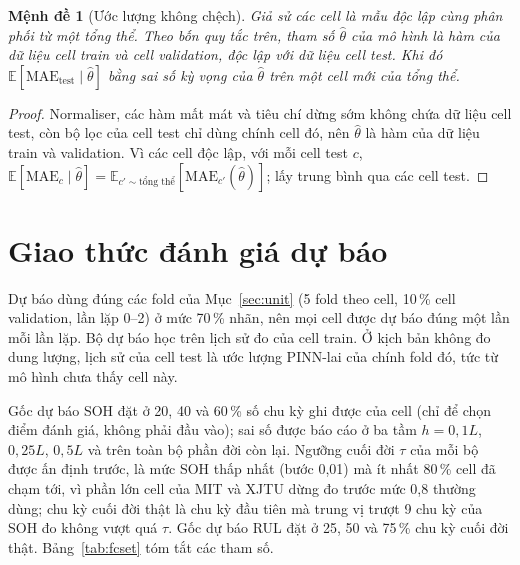\documentclass[12pt,a4paper,oneside]{report}
\theoremstyle{plain}
\newtheorem{menhde}{Mệnh đề}[chapter]
\theoremstyle{definition}
\newcommand{\E}{\mathbb{E}}
\begin{document}
\begin{menhde}[Ước lượng không chệch]\label{md:unbiased}
Giả sử các cell là mẫu độc lập cùng phân phối từ một tổng thể. Theo bốn quy tắc trên, tham số $\hat\theta$ của
mô hình là hàm của dữ liệu cell train và cell validation, độc lập với dữ liệu cell test. Khi đó
$\E[\mathrm{MAE}_\text{test} \mid \hat\theta]$ bằng sai số kỳ vọng của $\hat\theta$ trên một cell mới của tổng thể.
\end{menhde}
\begin{proof}
Normaliser, các hàm mất mát và tiêu chí dừng sớm không chứa dữ liệu cell test, còn bộ lọc của cell test chỉ dùng
chính cell đó, nên $\hat\theta$ là hàm của dữ liệu train và validation. Vì các cell độc lập, với mỗi cell test $c$,
$\E[\mathrm{MAE}_c \mid \hat\theta] = \E_{c' \sim \text{tổng thể}}[\mathrm{MAE}_{c'}(\hat\theta)]$; lấy trung bình qua
các cell test.
\end{proof}

\section{Giao thức đánh giá dự báo}\label{sec:fcproto}

Dự báo dùng đúng các fold của Mục~\ref{sec:unit} (5 fold theo cell, 10\,\% cell validation, lần lặp 0--2) ở mức 70\,\%
nhãn, nên mọi cell được dự báo đúng một lần mỗi lần lặp. Bộ dự báo học trên lịch sử đo của cell train. Ở kịch bản
không đo dung lượng, lịch sử của cell test là ước lượng PINN-lai của chính fold đó, tức từ mô hình chưa thấy cell này.

Gốc dự báo SOH đặt ở 20, 40 và 60\,\% số chu kỳ ghi được của cell (chỉ để chọn điểm đánh giá, không phải đầu vào);
sai số được báo cáo ở ba tầm $h = 0{,}1L$, $0{,}25L$, $0{,}5L$ và trên toàn bộ phần đời còn lại. Ngưỡng cuối đời $\tau$
của mỗi bộ được ấn định trước, là mức SOH thấp nhất (bước 0,01) mà ít nhất 80\,\% cell đã chạm tới, vì phần lớn cell
của MIT và XJTU dừng đo trước mức 0,8 thường dùng; chu kỳ cuối đời thật là chu kỳ đầu tiên mà trung vị trượt 9 chu kỳ
của SOH đo không vượt quá $\tau$. Gốc dự báo RUL đặt ở 25, 50 và 75\,\% chu kỳ cuối đời thật.
Bảng~\ref{tab:fcset} tóm tắt các tham số.
\end{document}
